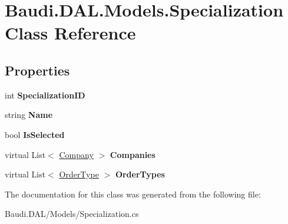 \hypertarget{class_baudi_1_1_d_a_l_1_1_models_1_1_specialization}{}\section{Baudi.\+D\+A\+L.\+Models.\+Specialization Class Reference}
\label{class_baudi_1_1_d_a_l_1_1_models_1_1_specialization}
\subsection*{Properties}
\begin{DoxyCompactItemize}
\item 
\hypertarget{class_baudi_1_1_d_a_l_1_1_models_1_1_specialization_a5db27f3383c696b8746ddb6eb1c49176}{}int {\bfseries Specialization\+I\+D}\label{class_baudi_1_1_d_a_l_1_1_models_1_1_specialization_a5db27f3383c696b8746ddb6eb1c49176}

\item 
\hypertarget{class_baudi_1_1_d_a_l_1_1_models_1_1_specialization_afb0d9007646b8e8e62b4c88dd6a1d5c8}{}string {\bfseries Name}\label{class_baudi_1_1_d_a_l_1_1_models_1_1_specialization_afb0d9007646b8e8e62b4c88dd6a1d5c8}

\item 
\hypertarget{class_baudi_1_1_d_a_l_1_1_models_1_1_specialization_a66b24747c7bc043620758cab5333d337}{}bool {\bfseries Is\+Selected}\label{class_baudi_1_1_d_a_l_1_1_models_1_1_specialization_a66b24747c7bc043620758cab5333d337}

\item 
\hypertarget{class_baudi_1_1_d_a_l_1_1_models_1_1_specialization_a730e0b3503a438116f1c5bd1ea1254d7}{}virtual List$<$ \hyperlink{class_baudi_1_1_d_a_l_1_1_models_1_1_company}{Company} $>$ {\bfseries Companies}\label{class_baudi_1_1_d_a_l_1_1_models_1_1_specialization_a730e0b3503a438116f1c5bd1ea1254d7}

\item 
\hypertarget{class_baudi_1_1_d_a_l_1_1_models_1_1_specialization_a2b597c6212ddafd37236a95bfab3aeef}{}virtual List$<$ \hyperlink{class_baudi_1_1_d_a_l_1_1_models_1_1_order_type}{Order\+Type} $>$ {\bfseries Order\+Types}\label{class_baudi_1_1_d_a_l_1_1_models_1_1_specialization_a2b597c6212ddafd37236a95bfab3aeef}

\end{DoxyCompactItemize}


The documentation for this class was generated from the following file\+:\begin{DoxyCompactItemize}
\item 
Baudi.\+D\+A\+L/\+Models/Specialization.\+cs\end{DoxyCompactItemize}
